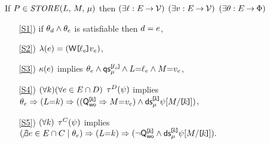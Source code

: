 \noindent
If $\aPS \in \sSTORE[\amode]{\cExp}{\aExp}$ then
$(\exists\ell:E\mathbin\rightarrow\mathcal{V})$
$(\exists v:E\mathbin\rightarrow\mathcal{V})$
$(\exists\theta:E\mathbin\rightarrow\Phi)$
\begin{enumerate}
\item[\ref{S1})] if $\theta_d\land\theta_e$ is satisfiable then $d=e$,
\item[\ref{S2})] $\labelingAct(\aEv) = \DWREFP{\cVal_\aEv}{\aVal_\aEv}$,
\item[\ref{S3})] 
  $\kappa(e)$ implies
  \begin{math}
    \theta_e
    \land \mathsf{qs}_{\mu}^{\mkern-2mu\texttt{[}\mkern-2mu\ell_e \mkern-2mu\texttt{]}\mkern-2mu}
    \land L{=}\ell_e
    \land M{=}v_e
  \end{math},
\item[\ref{S4})]
  \begin{math}
    (\forall k)
    (\forall e\in E\cap D)
  \end{math}
  $\aTr{\bEvs}{\bForm}$ implies 
  \begin{math}
    \theta_e
    \Rightarrow (L{=}k)
    \Rightarrow (
      (\mathsf{Q}_{\mathsf{wo}}^{\mkern-2mu\texttt{[}\mkern-2muk \mkern-2mu\texttt{]}\mkern-2mu} \Rightarrow M{=}v_e)
      \land \mathsf{ds}_{\mu}^{\mkern-2mu\texttt{[}\mkern-2muk \mkern-2mu\texttt{]}\mkern-2mu}\psi[M/\mkern-2mu\texttt{[}\mkern-2muk \mkern-2mu\texttt{]}\mkern-2mu]
    )
  \end{math},
\item[\ref{S5})] %
  \begin{math}
    (\forall k)
  \end{math}
  $\aTr{\cEvs}{\bForm}$ implies
  \begin{math}
    (\!\not\exists e\in E\cap C \mid \theta_e)
    \Rightarrow (L{=}k)
    \Rightarrow (
      \lnot\mathsf{Q}_{\mathsf{wo}}^{\mkern-2mu\texttt{[}\mkern-2muk \mkern-2mu\texttt{]}\mkern-2mu}
      \land \mathsf{ds}_{\mu}^{\mkern-2mu\texttt{[}\mkern-2muk \mkern-2mu\texttt{]}\mkern-2mu}\psi[M/\mkern-2mu\texttt{[}\mkern-2muk \mkern-2mu\texttt{]}\mkern-2mu]
    ).
  \end{math}
\end{enumerate}

